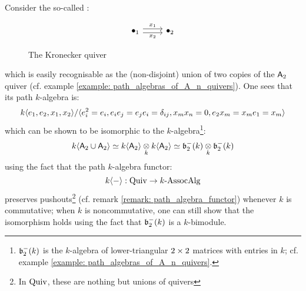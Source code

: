             \begin{example}
                Consider the so-called :
                    \begin{figure}[H]
                        \centering
                            $$
                                \begin{tikzcd}
                                	{\bullet_1} & {\bullet_2}
                                	\arrow["x_2"', shift right=1, from=1-1, to=1-2]
                                	\arrow["x_1", shift left=1, from=1-1, to=1-2]
                                \end{tikzcd}
                            $$
                        \caption{The Kronecker quiver}
                        \label{fig: kronecker_quiver}
                    \end{figure}
                which is easily recognisable as the (non-disjoint) union of two copies of the $\mathsf{A}_2$ quiver (cf. example \ref{example: path_algebras_of_A_n_quivers}). One sees that its path $k$-algebra is:
                    $$k\langle e_1, e_2, x_1, x_2\rangle/\langle e_i^2 = e_i, e_i e_j = e_j e_i = \delta_{ij}, x_m x_n = 0, e_2 x_m = x_m e_1 = x_m\rangle$$
                which can be shown to be isomorphic to the $k$-algebra\footnote{$\mathfrak{b}_2^-(k)$ is the $k$-algebra of lower-triangular $2 \x 2$ matrices with entries in $k$; cf. example \ref{example: path_algebras_of_A_n_quivers}.}:
                    $$k\<\sfA_2 \cup \sfA_2\> \cong k\<\sfA_2\> \tensor_k k\<\sfA_2\> \cong \b_2^-(k) \tensor_k \b_2^-(k)$$
                using the fact that the path $k$-algebra functor:
                    $$k\langle-\rangle: \mathrm{Quiv} \to k\text{-}\mathrm{Assoc}\mathrm{Alg}$$
                preserves pushouts\footnote{In $\mathrm{Quiv}$, these are nothing but unions of quivers} (cf. remark \ref{remark: path_algebra_functor}) whenever $k$ is commutative; when $k$ is noncommutative, one can still show that the isomorphism holds using the fact that $\mathfrak{b}_2^-(k)$ is a $k$-bimodule.
            \end{example}
